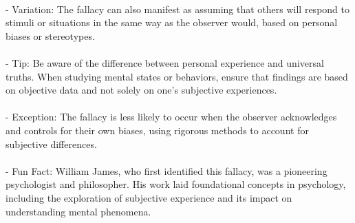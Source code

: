 \documentclass[a4paper,12pt,single,pdftex]{scrartcl}
\begin{document}
    
      
    \\

    
      - Variation: The fallacy can also manifest as assuming that others will respond to stimuli or situations in the same way as the observer would, based on personal biases or stereotypes.
    \\

    
      
    \\

    
      - Tip: Be aware of the difference between personal experience and universal truths. When studying mental states or behaviors, ensure that findings are based on objective data and not solely on one's subjective experiences.
    \\

    
      
    \\

    
      - Exception: The fallacy is less likely to occur when the observer acknowledges and controls for their own biases, using rigorous methods to account for subjective differences.
    \\

    
      
    \\

    
      - Fun Fact: William James, who first identified this fallacy, was a pioneering psychologist and philosopher. His work laid foundational concepts in psychology, including the exploration of subjective experience and its impact on understanding mental phenomena.
    \\
\end{document}
